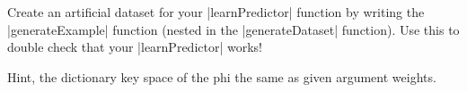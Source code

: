 \item {}

Create an artificial dataset for your |learnPredictor| function by
writing the |generateExample| function (nested in the |generateDataset|
function). Use this to double check that your |learnPredictor| works!

Hint, the dictionary key space of the phi the same as given argument weights.